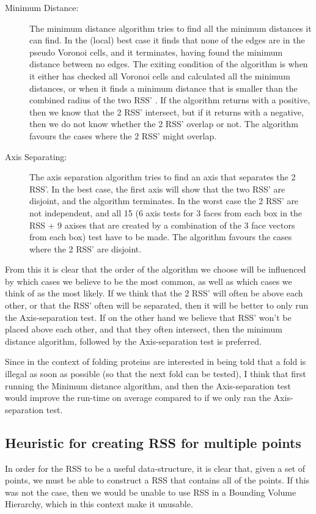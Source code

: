 \begin{description}
\item[Minimum Distance:] The minimum distance algorithm tries to find all the minimum distances it can find. In the (local) best case it finds that none of the edges are in the pseudo Voronoi cells, and it terminates, having found the minimum distance between no edges. The exiting condition of the algorithm is when it either has checked all Voronoi cells  and calculated all the minimum distances, or when it finds a minimum distance that is smaller than the combined radius of the two RSS' . If the algorithm returns with a positive, then we know that the 2 RSS' intersect, but if it returns with a negative, then we do not know whether the 2 RSS' overlap or not. The algorithm favours the cases where the 2 RSS' might overlap.  

\item[Axis Separating:] The axis separation algorithm tries to find an axis that separates the 2 RSS'. In the best case, the first axis will show that the two RSS' are disjoint, and the algorithm terminates. In the worst case the 2 RSS' are not independent, and all 15 (6 axis tests for 3 faces from each box in the RSS  + 9 axises that are created by a combination of the 3 face vectors from each box) test have to be made. The algorithm favours the cases where the 2 RSS' are disjoint.
\end{description}

From this it is clear that the order of the algorithm we choose will be influenced by which cases we believe to be the most common, as well as which cases we think of as the most likely. If we think that the 2 RSS' will often be above each other, or that the RSS' often will be separated, then it will be better to only run the Axis-separation test. If on the other hand we believe that RSS' won't be placed above each other, and that they often intersect, then the minimum distance algorithm, followed by the Axis-separation test is preferred.

Since in the context of folding proteins are interested in being told that a fold is illegal as soon as possible (so that the next fold can be tested), I think that first running the Minimum distance algorithm, and then the Axis-separation test would improve the run-time on average compared to if we only ran the Axis-separation test.

\subsection{Heuristic for creating RSS for multiple points}
In order for the RSS to be a useful data-structure, it is clear that, given a set of points, we must be able to construct a RSS that contains all of the points. If this was not the case, then we would be unable to use RSS in a Bounding Volume Hierarchy, which in this context make it unusable. 

